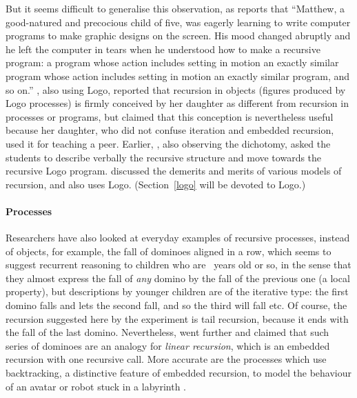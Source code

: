\documentclass[11pt,a4paper]{article}
\newcommand\plang[1]{\textsf{#1}\xspace}
\begin{document}
But it seems difficult to generalise this observation, as
\textcite{Turkle:1984} reports that ``Matthew, a good\hyp{}natured and
precocious child of five, was eagerly learning to write computer
programs to make graphic designs on the screen. His mood changed
abruptly and he left the computer in tears when he understood how to
make a recursive program: a program whose action includes setting in
motion an exactly similar program whose action includes setting in
motion an exactly similar program, and so on.''
\textcite{McDougall:1991}, also using \plang{Logo}, reported that
recursion in objects (figures produced by \plang{Logo} processes) is
firmly conceived by her daughter as different from recursion in
processes or programs, but claimed that this conception is
nevertheless useful because her daughter, who did not confuse
iteration and embedded recursion, used it for teaching a
peer. Earlier, \textcite{Thompson:1985}, also observing the dichotomy,
asked the students to describe verbally the recursive structure and
move towards the recursive \plang{Logo}
program. \textcite{Murnane:1991} discussed the demerits and merits of
various models of recursion, and also uses
\plang{Logo}. (Section~\ref{logo} will be devoted to \plang{Logo}.)

\paragraph{Processes}

Researchers have also looked at everyday examples of recursive
processes, instead of objects, for example, the fall of dominoes
aligned in a row, which seems to suggest recurrent reasoning to
children who are ~years old or so, in the sense that
they almost express the fall of \emph{any} domino by the fall of the
previous one (a local property), but descriptions by younger children
are of the iterative type: the first domino falls and lets the second
fall, and so the third will fall etc.\@ \citep{PiagetStratz:1974} Of
course, the recursion suggested here by the experiment is tail
recursion, because it ends with the fall of the last
domino. Nevertheless, \textcite{Yang:2004} \citeyearpar{Yang:2008}
went further and claimed that such series of dominoes are an analogy
for \emph{linear recursion}, which is an embedded recursion with one
recursive call. More accurate are the processes which use
backtracking, a distinctive feature of embedded recursion, to model
the behaviour of an avatar or robot stuck in a labyrinth
\citep{LissMcMillan:1988,Dorf:1992,Roberts:2006}.
\end{document}

